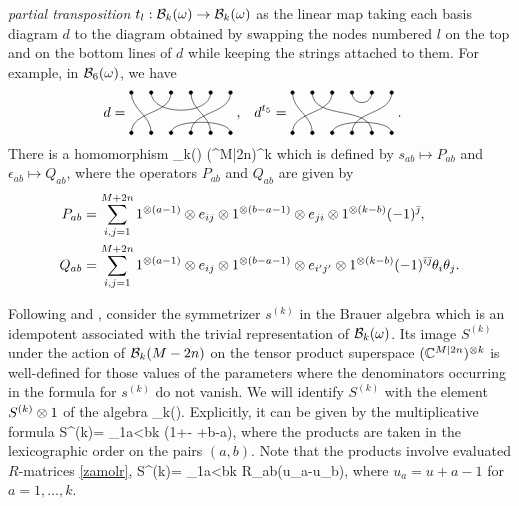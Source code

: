 \documentclass[12pt]{article}
\begin{document}
{\em partial transposition} $t_l:{\mathcal B}_k(\omega) \to {\mathcal B}_k(\omega)$
as the linear map taking each basis diagram $d$ to the diagram obtained
by swapping the nodes numbered $l$ on the top and on the bottom lines of $d$
while keeping the strings attached to them. For example, in ${\mathcal B}_6(\omega)$, we have
\begin{align}
    d &= \begin{tikzpicture}[baseline={([yshift=4.5mm]current bounding box.south)},scale=0.5]
{
\foreach \x in {0,...,5}{
\filldraw (\x,0) circle (0.09);
\filldraw (\x,2) circle (0.09);
}
\draw (0,0) to[out=90,in=270] (2,2);
\draw (1,0) to[out=90,in=270] (0,2);
\draw (2,0) ..controls (2,0.7) and (5,0.7).. (5,0);
\draw (3,0) to[out=90,in=270] (5,2);
\draw (4,0) to[out=90,in=270] (3,2);
\draw (1,2) to[out=270,in=270] (4,2);
}
\end{tikzpicture}\; ,
    &d^{t_5} &= \begin{tikzpicture}[baseline={([yshift=4.5mm]current bounding box.south)},scale=0.5]
{
\foreach \x in {0,...,5}{
\filldraw (\x,0) circle (0.09);
\filldraw (\x,2) circle (0.09);
}
\draw (0,0) to[out=90,in=270] (2,2);
\draw (1,0) to[out=90,in=270] (0,2);
\draw (2,0) ..controls (2,0.7) and (5,0.7).. (5,0);
\draw (3,0) to[out=90,in=270] (5,2);
\draw (4,0) to[out=90,in=270] (1,2);
\draw (3,2) arc(180:360:0.5);
}
\end{tikzpicture}\; .
\non
\end{align}
There is a homomorphism
\Bc_{k}(\om) \to \End(\CC^{M|2n})^{\otimes k}
\eeq
which is defined by $s_{ab} \mapsto P_{ab}$ and $\epsilon_{ab} \mapsto Q_{ab}$,
where the operators $P_{ab}$ and $Q_{ab}$ are given by
\begin{align}
P_{ab} &= \sum_{i,j=1}^{M+2n} 1^{\otimes (a-1)} \otimes e_{ij} \otimes 1^{\otimes (b-a-1)} \otimes e_{ji} \otimes 1^{\otimes (k-b)} (-1)^{\bar{\jmath}},
\label{pab}\\
Q_{ab} &= \sum_{i,j=1}^{M+2n} 1^{\otimes (a-1)} \otimes e_{ij} \otimes 1^{\otimes (b-a-1)} \otimes e_{i'j'} \otimes 1^{\otimes (k-b)} (-1)^{\bar{\imath}\bar{\jmath}} \theta_i\theta_j.
\label{qab}
\end{align}

Following \cite{mn:ss} and \cite[Sec.~1.2]{m:so}, consider the symmetrizer $s^{(k)}$ in the Brauer algebra
which is an idempotent associated with the trivial representation of ${\mathcal B}_k(\omega)$.
Its image $S^{(k)}$ under the action of ${\mathcal B}_k(M-2n)$ on the tensor product
superspace $(\mathbb{C}^{M|2n})^{\otimes k}$ is well-defined for those values
of the parameters where the denominators occurring in the formula for $s^{(k)}$
do not vanish.
We will identify $S^{(k)}$ with
the element
$S^{(k)}\otimes 1$ of the algebra
_k{}\ot\X(\g).
\eeq
Explicitly, it can be given by the multiplicative
formula
S^{(k)}=
\prod_{1\leqslant a<b\leqslant k}
\Big(1+-
{\ka+b-a}\Big),
\eeq
where
the products are taken in the lexicographic order
on the pairs $(a,b)$.
Note that
the products involve evaluated $R$-matrices \eqref{zamolr},
S^{(k)}=
\prod_{1\leqslant a<b\leqslant k} R_{a\tss b}(u_a-u_b),
\eeq
where $u_a=u+a-1$ for $a=1,\dots,k$.
\end{document}
